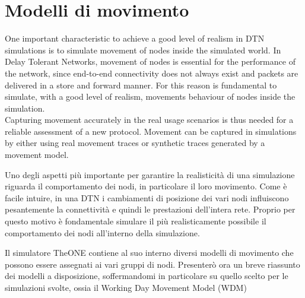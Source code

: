 
\chapter{Modelli di movimento}\label{movimento} %





One important characteristic to achieve a good level of realism in DTN simulations is to simulate movement of nodes inside the simulated world. In Delay Tolerant Networks, movement of nodes is essential for the performance of the network, since end-to-end connectivity does not always exist and packets are delivered in a store and forward manner. For this reason is fundamental to simulate, with a good level of realism, movements behaviour of nodes inside the simulation.
\\

 Capturing movement accurately in the real usage scenarios is thus needed for a reliable assessment of a new protocol. Movement can be captured in simulations by either using real movement traces or synthetic traces generated by a movement model.

Uno degli aspetti più importante per garantire la realisticità di una simulazione riguarda il comportamento dei nodi, in particolare il loro movimento. Come è facile intuire, in una DTN i cambiamenti di posizione dei vari nodi influiscono pesantemente la connettività e quindi le prestazioni dell'intera rete. Proprio per questo motivo è fondamentale simulare il più realisticamente possibile il comportamento dei nodi all'interno della simulazione.


Il simulatore TheONE contiene al suo interno diversi modelli di movimento che possono essere assegnati ai vari gruppi di nodi. Presenterò ora un breve riassunto dei modelli a disposizione, soffermandomi in particolare su quello scelto per le simulazioni svolte, ossia il Working Day Movement Model (WDM)


